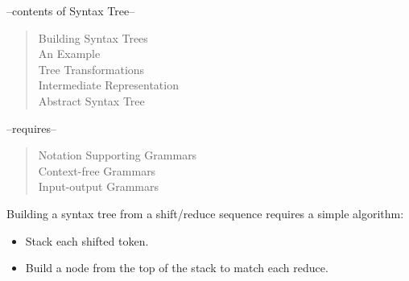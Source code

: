 





\begin{center}
\begin{small}
\noindent --contents of Syntax Tree--
\begin{quote}
\raggedright
Building Syntax Trees\\
An Example\\
Tree Transformations\\
Intermediate Representation\\
Abstract Syntax Tree\\
\end{quote}
--requires--
\begin{quote}
\raggedright
Notation Supporting Grammars\\
Context-free Grammars\\
Input-output Grammars
\end{quote}
\end{small}
\end{center}

\vspace{1em}


\vspace{1em}

\noindent Building a syntax tree from a shift/reduce sequence requires a 
simple algorithm:
\begin{itemize}
\item Stack each shifted token.
\item Build a node from the top of the stack to match each reduce.
\end{itemize}

